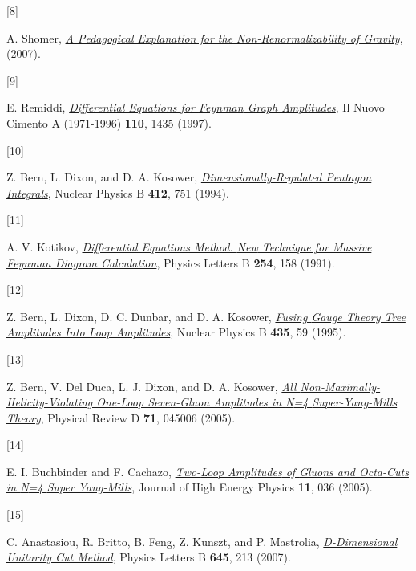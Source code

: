 \documentclass[
  11pt,
  a4paper,
  DIV=11,
  numbers=noendperiod,
  twoside]{scrreprt}
\newlength{\cslhangindent}
\newlength{\csllabelwidth}
\newlength{\cslentryspacingunit} %
\newenvironment{CSLReferences}[2] %
 {%
  \setlength{\parindent}{0pt}
  \ifodd #1
  \let\oldpar\par
  \def\par{\hangindent=\cslhangindent\oldpar}
  \fi
  \setlength{\parskip}{#2\cslentryspacingunit}
 }%
 {}
\newcommand{\CSLLeftMargin}[1]{\parbox[t]{\csllabelwidth}{#1}}
\newcommand{\CSLRightInline}[1]{\parbox[t]{\linewidth - \csllabelwidth}{#1}\break}
\DeclareRobustCommand{\[}{\begin{equation}}
\DeclareRobustCommand{\]}{\end{equation}}
\begin{document}
\begin{CSLReferences}{0}{0}
\leavevmode{}%
\CSLLeftMargin{{[}8{]} }%
\CSLRightInline{A. Shomer,
\emph{\href{https://arxiv.org/abs/0709.3555}{A Pedagogical Explanation
for the Non-Renormalizability of Gravity}}, (2007).}

\leavevmode{}%
\CSLLeftMargin{{[}9{]} }%
\CSLRightInline{E. Remiddi,
\emph{\href{https://doi.org/10.1007/BF03185566}{Differential Equations
for {Feynman} Graph Amplitudes}}, Il Nuovo Cimento A (1971-1996)
\textbf{110}, 1435 (1997).}

\leavevmode{}%
\CSLLeftMargin{{[}10{]} }%
\CSLRightInline{Z. Bern, L. Dixon, and D. A. Kosower,
\emph{\href{https://doi.org/10.1016/0550-3213(94)90398-0}{Dimensionally-Regulated
Pentagon Integrals}}, Nuclear Physics B \textbf{412}, 751 (1994).}

\leavevmode{}%
\CSLLeftMargin{{[}11{]} }%
\CSLRightInline{A. V. Kotikov,
\emph{\href{https://doi.org/10.1016/0370-2693(91)90413-K}{Differential
Equations Method. {New} Technique for Massive {Feynman} Diagram
Calculation}}, Physics Letters B \textbf{254}, 158 (1991).}

\leavevmode{}%
\CSLLeftMargin{{[}12{]} }%
\CSLRightInline{Z. Bern, L. Dixon, D. C. Dunbar, and D. A. Kosower,
\emph{\href{https://doi.org/10.1016/0550-3213(94)00488-Z}{Fusing {Gauge
Theory Tree Amplitudes Into Loop Amplitudes}}}, Nuclear Physics B
\textbf{435}, 59 (1995).}

\leavevmode{}%
\CSLLeftMargin{{[}13{]} }%
\CSLRightInline{Z. Bern, V. Del Duca, L. J. Dixon, and D. A. Kosower,
\emph{\href{https://doi.org/10.1103/PhysRevD.71.045006}{All
{Non-Maximally-Helicity-Violating One-Loop Seven-Gluon Amplitudes} in
{N}=4 {Super-Yang-Mills Theory}}}, Physical Review D \textbf{71}, 045006
(2005).}

\leavevmode{}%
\CSLLeftMargin{{[}14{]} }%
\CSLRightInline{E. I. Buchbinder and F. Cachazo,
\emph{\href{https://doi.org/10.1088/1126-6708/2005/11/036}{Two-{Loop
Amplitudes} of {Gluons} and {Octa-Cuts} in {N}=4 {Super Yang-Mills}}},
Journal of High Energy Physics \textbf{11}, 036 (2005).}

\leavevmode{}%
\CSLLeftMargin{{[}15{]} }%
\CSLRightInline{C. Anastasiou, R. Britto, B. Feng, Z. Kunszt, and P.
Mastrolia,
\emph{\href{https://doi.org/10.1016/j.physletb.2006.12.022}{D-Dimensional
Unitarity Cut Method}}, Physics Letters B \textbf{645}, 213 (2007).}


\end{CSLReferences}
\end{document}
